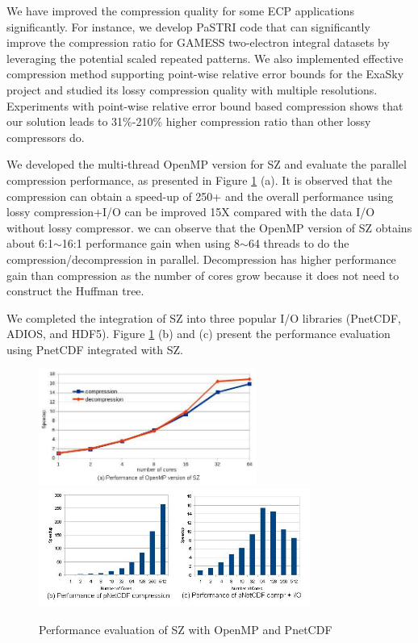 We have improved the compression quality for some ECP applications significantly. For instance, we develop PaSTRI code that can significantly improve the compression ratio for GAMESS two-electron integral datasets by leveraging the potential scaled repeated patterns. We also implemented effective compression method supporting point-wise relative error bounds for the ExaSky project and studied its lossy compression quality with multiple resolutions. Experiments with point-wise relative error bound based compression shows that our solution leads to 31\%-210\% higher compression ratio than other lossy compressors do.

We developed the multi-thread OpenMP version for SZ and evaluate the parallel compression performance, as presented in Figure \ref{fig:openmpperformance} (a). It is observed that the compression can obtain a speed-up of 250+ and the overall performance using lossy compression+I/O can be improved 15X compared with the data I/O without lossy compressor.
we can observe that the OpenMP version of SZ obtains about 6:1$\sim$16:1 performance gain when using 8$\sim$64 threads to do the compression/decompression in parallel. Decompression has higher performance gain than compression as the number of cores grow because it does not need to construct the Huffman tree.

We completed the integration of SZ into three popular I/O libraries (PnetCDF, ADIOS, and HDF5). Figure \ref{fig:openmpperformance} (b) and (c) present the performance evaluation using PnetCDF integrated with SZ.

\begin{figure}[htb]
\centering
\includegraphics[width=2.8in]{projects/2.3.4-DataViz/2.3.4.06-EZ/openmp-perf-SZ.jpg}
\includegraphics[width=3.5in]{projects/2.3.4-DataViz/2.3.4.06-EZ/pNetCDF-perf-SZ.jpg}
\caption{Performance evaluation of SZ with OpenMP and PnetCDF}
\label{fig:openmpperformance}
\end{figure}


